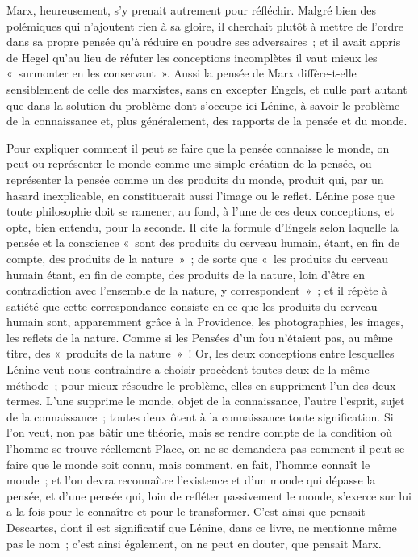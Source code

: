 \documentclass[french,twoside]{book} %
\begin{document}
Marx, heureusement, s'y prenait autrement pour réfléchir. Malgré bien des polémiques qui n'ajoutent rien à sa gloire, il cherchait plutôt à mettre de l'ordre dans sa propre pensée qu'à réduire en poudre ses adversaires ; et il avait appris de Hegel qu'au lieu de réfuter les conceptions incomplètes il vaut mieux les « surmonter en les conservant ». Aussi la pensée de Marx diffère-t-elle sensiblement de celle des marxistes, sans en excepter Engels, et nulle part autant que dans la solution du problème dont s'occupe ici Lénine, à savoir le problème de la connaissance et, plus généralement, des rapports de la pensée et du monde.\par
Pour expliquer comment il peut se faire que la pensée connaisse le monde, on peut ou représenter le monde comme une simple création de la pensée, ou représenter la pensée comme un des produits du monde, produit qui, par un hasard inexplicable, en constituerait aussi l'image ou le reflet. Lénine pose que toute philosophie doit se ramener, au fond, à l'une de ces deux conceptions, et opte, bien entendu, pour la seconde. Il cite la formule d'Engels selon laquelle la pensée et la conscience « sont des produits du cerveau humain, étant, en fin de compte, des produits de la nature » ; de sorte que « les produits du cerveau humain étant, en fin de compte, des produits de la nature, loin d'être en contradiction avec l'ensemble de la nature, y correspondent » ; et il répète à satiété que cette correspondance consiste en ce que les produits du cerveau humain sont, apparemment grâce à la Providence, les photographies, les images, les reflets de la nature. Comme si les Pensées d'un fou n'étaient pas, au même titre, des « produits de la nature » ! Or, les deux conceptions entre lesquelles Lénine veut nous contraindre a choisir procèdent toutes deux de la même méthode ; pour mieux résoudre le problème, elles en suppriment l'un des deux termes. L'une supprime le monde, objet de la connaissance, l'autre l'esprit, sujet de la connaissance ; toutes deux ôtent à la connaissance toute signification. Si l'on veut, non pas bâtir une théorie, mais se rendre compte de la condition où l'homme se trouve réellement Place, on ne se demandera pas comment il peut se faire que le monde soit connu, mais comment, en fait, l'homme connaît le monde ; et l'on devra reconnaître l'existence et d'un monde qui dépasse la pensée, et d'une pensée qui, loin de refléter passivement le monde, s'exerce sur lui a la fois pour le connaître et pour le transformer. C'est ainsi que pensait Descartes, dont il est significatif que Lénine, dans ce livre, ne mentionne même pas le nom ; c'est ainsi également, on ne peut en douter, que pensait Marx.\par
\end{document}
